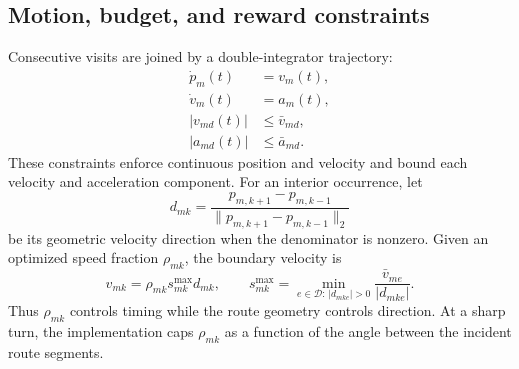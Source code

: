 \subsection{Motion, budget, and reward constraints}
Consecutive visits are joined by a double-integrator trajectory:
\begin{equation}
 \begin{aligned}
  \dot p_m(t) &= v_m(t),\\
  \dot v_m(t) &= a_m(t),\\
  |v_{md}(t)| &\le \bar v_{md},\\
  |a_{md}(t)| &\le \bar a_{md}.
 \end{aligned}
 \label{eq:dynamics}
\end{equation}
These constraints enforce continuous position and velocity and bound each velocity and acceleration component. For an interior occurrence, let
\begin{equation}
 d_{mk}=\frac{p_{m,k+1}-p_{m,k-1}}{\|p_{m,k+1}-p_{m,k-1}\|_2}
 \label{eq:geometric_heading}
\end{equation}
be its geometric velocity direction when the denominator is nonzero. Given an optimized speed fraction $\rho_{mk}$, the boundary velocity is
\begin{equation}
 v_{mk}=\rho_{mk}s^{\max}_{mk}d_{mk},\qquad
 s^{\max}_{mk}=\min_{e\in\mathcal D:\,|d_{mke}|>0}\frac{\bar v_{me}}{|d_{mke}|}.
 \label{eq:visit_velocity}
\end{equation}
Thus $\rho_{mk}$ controls timing while the route geometry controls direction. At a sharp turn, the implementation caps $\rho_{mk}$ as a function of the angle between the incident route segments.

